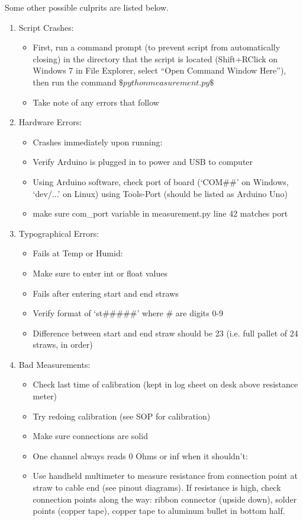 \documentclass[letterpaper,12pt]{article}
\begin{document}
Some other possible culprits are listed below.

\begin{enumerate}
	\item Script Crashes:
	\begin{itemize}
		\item First, run a command prompt (to prevent script from automatically closing) in the directory that the script is located (Shift+RClick on Windows 7 in File Explorer, select “Open Command Window Here”), then run the command 
$ \$ python measurement.py \$ $
		\item Take note of any errors that follow
	\end{itemize}
	\item Hardware Errors:
	\begin{itemize}
		\item Crashes immediately upon running:
		\item Verify Arduino is plugged in to power and USB to computer
		\item Using Arduino software, check port of board (‘COM\#\#’ on Windows, ‘dev/...’ on Linux) using Tools-Port (should be listed as Arduino Uno)
		\item make sure com\_port variable in measurement.py line 42 matches port
	\end{itemize}
	\item Typographical Errors:
	\begin{itemize}
		\item Fails at Temp or Humid:
		\item Make sure to enter int or float values
		\item Fails after entering start and end straws
		\item Verify format of ‘st\#\#\#\#\#’ where \# are digits 0-9
		\item Difference between start and end straw should be 23 (i.e. full pallet of 24 straws, in order)
	\end{itemize}
	\item Bad Measurements:
	\begin{itemize}
		\item Check last time of calibration (kept in log sheet on desk above resistance meter)
		\item Try redoing calibration (see SOP for calibration)
		\item Make sure connections are solid
		\item One channel always reads 0 Ohms or inf when it shouldn’t:
		\item Use handheld multimeter to measure resistance from connection point at straw to cable end (see pinout diagrams). If resistance is high, check connection points along the way: ribbon connector (upside down), solder points (copper tape), copper tape to aluminum bullet in bottom half.

\end{itemize}
\end{enumerate}
\end{document}
